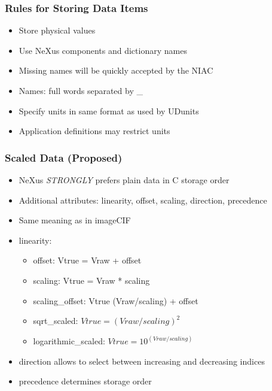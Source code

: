 \documentclass{beamer}
\begin{document}
\begin{frame}
\frametitle{Rules for Storing Data Items}
\begin{itemize}
\item Store physical values
\item Use NeXus components and dictionary names
\item Missing names will be quickly accepted by the NIAC
\item Names: full words separated by \_
\item Specify units in same format as used by UDunits
\item Application definitions may restrict units
\end{itemize}
\end{frame}

\begin{frame}
\frametitle{Scaled Data (Proposed)}
\begin{itemize}
\item NeXus {\em STRONGLY} prefers plain data in C storage order
\item Additional  attributes: linearity, offset, scaling, direction, precedence
\item Same meaning as in imageCIF
\item linearity:
\begin{itemize}
\item offset: Vtrue = Vraw + offset
\item scaling: Vtrue = Vraw * scaling
\item scaling\_offset: Vtrue (Vraw/scaling) + offset
\item sqrt\_scaled: $Vtrue = (Vraw/scaling)^2$
\item logarithmic\_scaled: $Vtrue = 10^(Vraw/scaling)$
\end{itemize}
\item direction allows to select between increasing and decreasing indices
\item precedence determines storage order
\end{itemize}
\end{frame}
\end{document}
